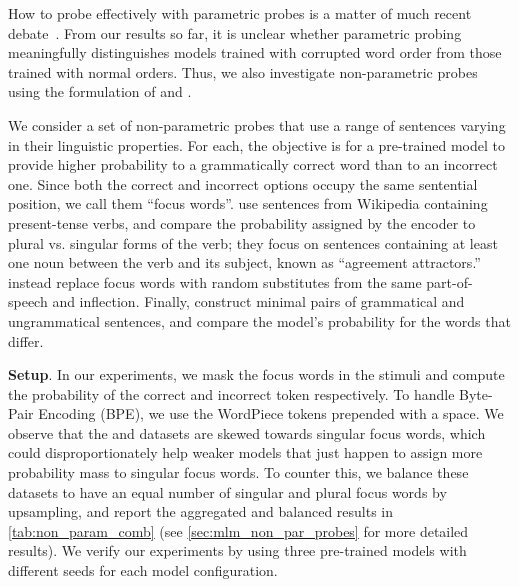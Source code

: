 \documentclass[letterpaper, 12pt]{report}
\newcommand{\xhdr}[1]{{\noindent\bfseries #1}.}
\begin{document}
How to probe effectively with parametric probes is a matter of much recent debate~\citep{hall-maudslay-etal-2020-tale, belinkov2021probing}. From our results so far, it is unclear whether parametric probing meaningfully distinguishes models trained with corrupted word order from those trained with normal orders. Thus, we also investigate non-parametric probes~\citep{linzen-etal-2016-assessing,marvin-linzen-2018-targeted,gulordava-etal-2018-colorless} using the formulation of \citet{goldberg2019assessing} and \citet{wolf2019}.%

We consider a set of non-parametric probes that use a range of sentences varying in their linguistic properties. For each, the objective is for a pre-trained model to provide higher probability to a grammatically correct word than to an incorrect one.
Since both the correct and incorrect options occupy the same sentential position, we call them ``focus words''. \citet{linzen-etal-2016-assessing} use sentences from Wikipedia containing present-tense verbs, and compare the probability assigned by the encoder to plural vs. singular forms of the verb; they focus on sentences containing at least one noun between the verb and its subject, known as ``agreement attractors.'' \citet{gulordava-etal-2018-colorless} instead replace focus words with random substitutes from the same part-of-speech and inflection. Finally, \citet{marvin-linzen-2018-targeted} construct minimal pairs of grammatical and ungrammatical sentences, and compare the model's probability for the words that differ.

\xhdr{Setup} In our experiments, we mask the focus words in the stimuli and compute the probability of the correct and incorrect token respectively.
To handle Byte-Pair Encoding (BPE), we use the WordPiece \citep{wu2016googles} tokens prepended with a space. %
We observe that the \citet{linzen-etal-2016-assessing} and \citet{gulordava-etal-2018-colorless} datasets are skewed towards singular focus words, which could disproportionately help weaker models that just happen to assign more probability mass to singular focus words. To counter this, we balance these datasets to have an equal number of singular and plural focus words by upsampling, and report the aggregated and balanced results in \autoref{tab:non_param_comb} (see \autoref{sec:mlm_non_par_probes} for more detailed results). We verify our experiments by using three pre-trained models with different seeds for each model configuration.
\end{document}
